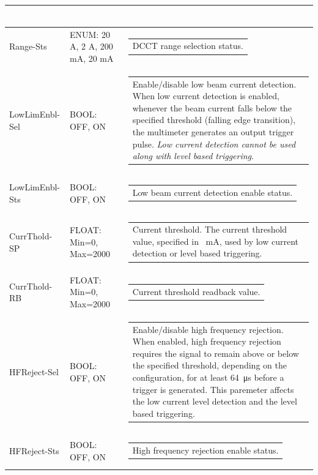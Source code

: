 \documentclass[openany]{article}
\begin{document}
\begin{longtable}{| m{3.0cm} m{4.5cm} m{7.0cm} |}
\begin{tabular}{@{}m{6cm}@{}}
						\end{tabular} \\ \hline
		Range-Sts & ENUM: 20 A, 2 A, 200 mA, 20 mA & \begin{tabular}{@{}m{6cm}@{}}
	    					DCCT range selection status.
						\end{tabular} \\ \hline
		LowLimEnbl-Sel & BOOL: OFF, ON & \begin{tabular}{@{}m{6cm}@{}}
	    					Enable/disable low beam current detection. When low current detection is enabled, whenever the beam current falls below the specified threshold (falling edge transition), the multimeter generates an output trigger pulse. \emph{Low current detection cannot be used along with level based triggering}.
						\end{tabular} \\ \hline
		LowLimEnbl-Sts & BOOL: OFF, ON & \begin{tabular}{@{}m{6cm}@{}}
	    					Low beam current detection enable status.
						\end{tabular} \\ \hline
		CurrThold-SP & FLOAT: Min=0, Max=2000 & \begin{tabular}{@{}m{6cm}@{}}
	    					Current threshold. The current threshold value, specified in \SI{}{\milli\ampere}, used by low current detection or level based triggering.
						\end{tabular} \\ \hline
		CurrThold-RB & FLOAT: Min=0, Max=2000 & \begin{tabular}{@{}m{6cm}@{}}
	    					Current threshold readback value.
						\end{tabular} \\ \hline
		HFReject-Sel & BOOL: OFF, ON & \begin{tabular}{@{}m{6cm}@{}}
	    					Enable/disable high frequency rejection. When enabled, high frequency rejection requires the signal to remain above or below the specified threshold, depending on the configuration, for at least \SI{64}{\micro\second} before a trigger is generated. This paremeter affects the low current level detection and the level based triggering.
						\end{tabular} \\ \hline
		HFReject-Sts & BOOL: OFF, ON & \begin{tabular}{@{}m{6cm}@{}}
	    					High frequency rejection enable status.

\end{tabular}
\end{longtable}
\end{document}
